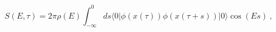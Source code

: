 \begin{equation} \label{l81-04}
S(E, \tau)=2\pi \rho (E) \int _{-\infty}^{0}ds\langle 0|\phi(x(\tau))\phi(x(\tau +s))|0\rangle\cos(Es)~,
\end{equation}

